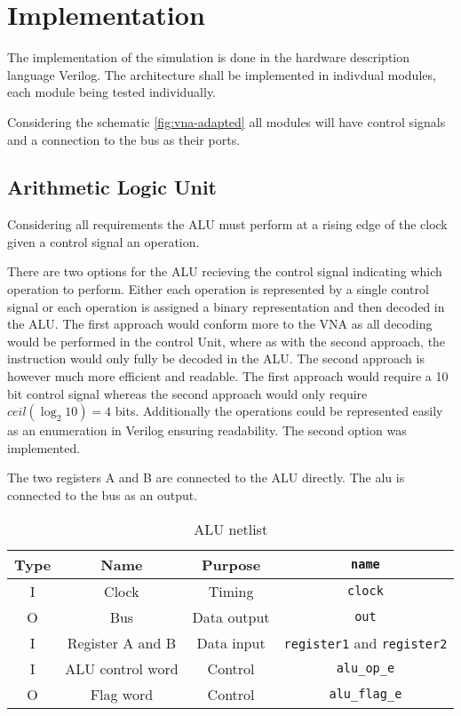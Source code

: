 \section{Implementation}



The implementation of the simulation is done in the hardware description language Verilog. The architecture shall be implemented in indivdual modules, each module being tested individually.    

Considering the schematic \ref{fig:vna-adapted} all modules will have control signals and a connection to the bus as their ports.  

\subsection{Arithmetic Logic Unit}
Considering all requirements the ALU must perform at a rising edge of the clock given a control signal an operation. 


There are two options for the ALU recieving the control signal indicating which operation to perform. Either each operation is represented by a single control signal or each operation is assigned a binary representation and then decoded in the ALU. The first approach would conform more to the VNA as all decoding would be performed in the control Unit, where as with the second approach, the instruction would only fully be decoded in the ALU. The second approach is however much more efficient and readable. The first approach would require a 10 bit control signal whereas the second approach would only require $ceil(\log_2 10) = 4$ bits. Additionally the operations could be represented easily as an enumeration in Verilog ensuring readability. The second option was implemented. 

The two registers A and B are connected to the ALU directly. The alu is connected to the bus as an output. 

\begin{table}[H]
\begin{tabular}{cccc}
  Type& Name & Purpose & \texttt{name}\\ \hline
  I   & Clock & Timing & \texttt{clock}\\
  O   & Bus     & Data output & \texttt{out}        \\
  I   & Register A and B & Data input & \texttt{register1} and \texttt{register2} \\
  I   & ALU control word & Control & \texttt{alu\_op\_e}\\
O   & Flag word & Control & \texttt{alu\_flag\_e}
\end{tabular}
\caption{ALU netlist}
\label{tab:alu-i/o}
\end{table}

